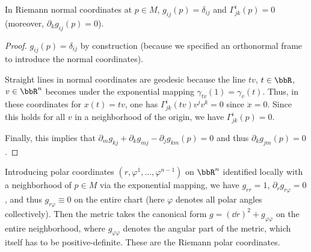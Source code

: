 \begin{prop}
    In Riemann normal coordinates at $p\in M$, $g_{ij}(p)=\delta_{ij}$ and $\Gamma^i_{jk}(p)=0$ (moreover, $\partial_k g_{ij}(p)=0$).
\end{prop}
\begin{proof}
    $g_{ij}(p)=\delta_{ij}$ by construction (because we specified an orthonormal frame to introduce the normal coordinates).
    
    Straight lines in normal coordinates are geodesic because the line $tv$, $t\in\bbR $, $v\in\bbR^n$ becomes under the exponential mapping $\gamma_{tv}(1)=\gamma_v(t)$. Thus, in these coordinates for $x(t)=tv$, one has $\Gamma^i_{jk}(tv)v^jv^k=0$ since $\ddot x=0$. Since this holds for all $v$ in a neighborhood of the origin, we have $\Gamma^i_{jk}(p)=0$. 
    
    Finally, this implies that $\partial_m g_{kj}+\partial_k g_{mj}-\partial_j g_{km}(p)=0$ and thus $\partial_k g_{jm}(p)=0$.
\end{proof}

\begin{defn}
    Introducing polar coordinates $(r,\varphi^1,\ldots,\varphi^{n-1})$ on $\bbR^n$ identified locally with a neighborhood of $p\in M$ via the exponential mapping, we have $g_{rr}=1$, $\partial_r g_{r\varphi}=0$, and thus $g_{r\varphi}\equiv 0$ on the entire chart (here $\varphi$ denotes all polar angles collectively). Then the metric takes the canonical form $g=(\dd r)^2+g_{\varphi\varphi}$ on the entire neighborhood, where $g_{\varphi\varphi}$ denotes the angular part of the metric, which itself has to be positive-definite. These are the Riemann polar coordinates.
\end{defn}

